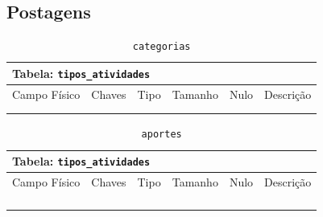 \documentclass[12pt,a4paper]{article}
\begin{document}
\subsection{Postagens}


\begin{center}
\begin{table}[h!]
	\caption{\texttt{categorias}}
	\label{tabela:categorias}
	\begin{tabular}{|p{2.5cm}|p{1cm}|p{1.25cm}|p{1.75cm}|p{1.25cm}|p{5cm}|}\hline	
		\multicolumn{6}{|p{16cm}|}{\cellcolor{cinzaClaro}  \centering Tabela: \texttt{tipos\_atividades}} \\ \hline %
		{\small Campo Físico}   & {\small Chaves} & {\small Tipo} & {\small Tamanho} & {\small Nulo} & {\small Descrição}\\\hline %
		
		{\tiny } & {\tiny } & {\tiny } & {\tiny } & {\tiny } &{\tiny }\\\hline
		{\tiny } & {\tiny } & {\tiny } & {\tiny } & {\tiny } &{\tiny }\\\hline
		
			
	\end{tabular}
\end{table}	
\end{center}

\begin{center}
\begin{table}[h!]
	\caption{\texttt{aportes}}
	\label{tabela:aportes}
	\begin{tabular}{|p{2.5cm}|p{1cm}|p{1.25cm}|p{1.75cm}|p{1.25cm}|p{5cm}|}\hline	
		\multicolumn{6}{|p{16cm}|}{\cellcolor{cinzaClaro}  \centering Tabela: \texttt{tipos\_atividades}} \\ \hline %
		{\small Campo Físico}   & {\small Chaves} & {\small Tipo} & {\small Tamanho} & {\small Nulo} & {\small Descrição}\\\hline %
		
		{\tiny } & {\tiny } & {\tiny } & {\tiny } & {\tiny } &{\tiny }\\\hline
		{\tiny } & {\tiny } & {\tiny } & {\tiny } & {\tiny } &{\tiny }\\\hline
		{\tiny } & {\tiny } & {\tiny } & {\tiny } & {\tiny } &{\tiny }\\\hline
		{\tiny } & {\tiny } & {\tiny } & {\tiny } & {\tiny } &{\tiny }\\\hline
			
	\end{tabular}
\end{table}	
\end{center}
\end{document}

